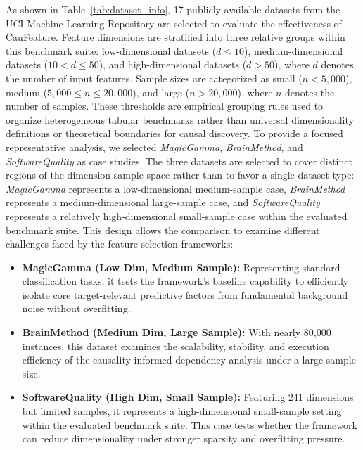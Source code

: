 \documentclass[journal]{IEEEtran}
\begin{document}
As shown in Table~\ref{tab:dataset_info}, 17 publicly available datasets from the UCI Machine Learning Repository are selected to evaluate the effectiveness of CauFeature. %
Feature dimensions are stratified into three relative groups within this benchmark suite: low-dimensional datasets ($d \leq 10$), medium-dimensional datasets ($10 < d \leq 50$), and high-dimensional datasets ($d > 50$), where $d$ denotes the number of input features. Sample sizes are categorized as small ($n < 5{,}000$), medium ($5{,}000 \leq n \leq 20{,}000$), and large ($n > 20{,}000$), where $n$ denotes the number of samples. These thresholds are empirical grouping rules used to organize heterogeneous tabular benchmarks rather than universal dimensionality definitions or theoretical boundaries for causal discovery.
To provide a focused representative analysis, we selected \textit{MagicGamma}, \textit{BrainMethod}, and \textit{SoftwareQuality} as case studies. The three datasets are selected to cover distinct regions of the dimension-sample space rather than to favor a single dataset type: \textit{MagicGamma} represents a low-dimensional medium-sample case, \textit{BrainMethod} represents a medium-dimensional large-sample case, and \textit{SoftwareQuality} represents a relatively high-dimensional small-sample case within the evaluated benchmark suite. This design allows the comparison to examine different challenges faced by the feature selection frameworks:
\begin{itemize}
    \item \textbf{MagicGamma (Low Dim, Medium Sample):} Representing standard classification tasks, it tests the framework's baseline capability to efficiently isolate core target-relevant predictive factors from fundamental background noise without overfitting.
\item \textbf{BrainMethod (Medium Dim, Large Sample):} With nearly 80,000 instances, this dataset examines the scalability, stability, and execution efficiency of the causality-informed dependency analysis under a large sample size.
    \item \textbf{SoftwareQuality (High Dim, Small Sample):} Featuring 241 dimensions but limited samples, it represents a high-dimensional small-sample setting within the evaluated benchmark suite. This case tests whether the framework can reduce dimensionality under stronger sparsity and overfitting pressure.
\end{itemize}
\end{document}
